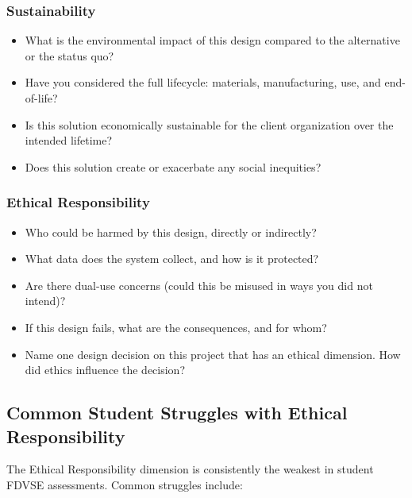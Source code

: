 \subsubsection*{Sustainability}
\begin{paquestion}
\begin{itemize}[nosep,leftmargin=1.5em]
\item What is the environmental impact of this design compared to the alternative or the status quo?
\item Have you considered the full lifecycle: materials, manufacturing, use, and end-of-life?
\item Is this solution economically sustainable for the client organization over the intended lifetime?
\item Does this solution create or exacerbate any social inequities?
\end{itemize}
\end{paquestion}

\subsubsection*{Ethical Responsibility}
\begin{paquestion}
\begin{itemize}[nosep,leftmargin=1.5em]
\item Who could be harmed by this design, directly or indirectly?
\item What data does the system collect, and how is it protected?
\item Are there dual-use concerns (could this be misused in ways you did not intend)?
\item If this design fails, what are the consequences, and for whom?
\item Name one design decision on this project that has an ethical dimension. How did ethics influence the decision?
\end{itemize}
\end{paquestion}

\subsection{Common Student Struggles with Ethical Responsibility}

The Ethical Responsibility dimension is consistently the weakest in student FDVSE assessments. Common struggles include:

